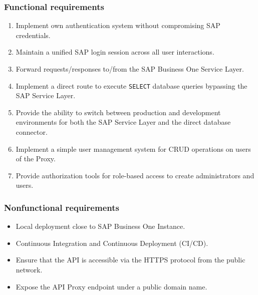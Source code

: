 \subsubsection{Functional requirements}
\label{subsubs:functional-requirements}
\begin{enumerate}[label=\bfseries \text{FR-SAP}\arabic*:,leftmargin=*]
    \item Implement own authentication system without compromising SAP credentials.
    \item Maintain a unified SAP login session across all user interactions.
    \item Forward requests/responses to/from the SAP Business One Service Layer.
    \item Implement a direct route to execute \texttt{SELECT} database queries bypassing the SAP Service Layer.
    \item Provide the ability to switch between production and development environments for both the SAP Service Layer and the direct database connector.
    \item Implement a simple user management system for CRUD operations on users of the Proxy.
    \item Provide authorization tools for role-based access to create administrators and users.
\end{enumerate}

\subsubsection{Nonfunctional requirements}
\label{subsubsec:nonfunctional-requirements}
\begin{itemize}
    \item Local deployment close to SAP Business One Instance.
    \item Continuous Integration and Continuous Deployment (\ac{CI}/\ac{CD}).
    \item Ensure that the API is accessible via the HTTPS protocol from the public network.
    \item Expose the API Proxy endpoint under a public domain name.
\end{itemize}

